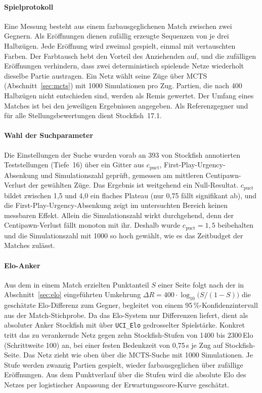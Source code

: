 \documentclass[
  a4paper, 12pt,
  parskip=half,
  headings=small,
  bibliography=totoc
]{scrartcl}
\begin{document}
\paragraph{Spielprotokoll}
Eine Messung besteht aus einem farbausgeglichenen Match zwischen zwei Gegnern.
Als Eröffnungen dienen zufällig erzeugte Sequenzen von je drei Halbzügen. Jede
Eröffnung wird zweimal gespielt, einmal mit vertauschten Farben. Der Farbtausch
hebt den Vorteil des Anziehenden auf, und die zufälligen Eröffnungen verhindern,
dass zwei deterministisch spielende Netze wiederholt dieselbe Partie austragen.
Ein Netz wählt seine Züge über MCTS
(Abschnitt~\ref{sec:mcts}) mit 1000 Simulationen pro Zug. Partien, die nach 400
Halbzügen nicht entschieden sind, werden als Remis gewertet. Der Umfang eines
Matches ist bei den jeweiligen Ergebnissen angegeben. Als Referenzgegner und für
alle Stellungsbewertungen dient Stockfish~17.1.

\paragraph{Wahl der Suchparameter}
Die Einstellungen der Suche wurden vorab an 393 von Stockfish annotierten
Teststellungen (Tiefe~16) über ein Gitter aus
\(c_{\mathrm{puct}}\), First-Play-Urgency-Absenkung und Simulationszahl geprüft,
gemessen am mittleren Centipawn-Verlust der gewählten Züge. Das Ergebnis ist
weitgehend ein Null-Resultat. \(c_{\mathrm{puct}}\) bildet zwischen 1{,}5 und 4{,}0
ein flaches Plateau (nur 0{,}75 fällt signifikant ab), und die
First-Play-Urgency-Absenkung zeigt im untersuchten Bereich keinen messbaren Effekt.
Allein die Simulationszahl wirkt durchgehend, denn der Centipawn-Verlust fällt
monoton mit ihr. Deshalb wurde \(c_{\mathrm{puct}} = 1{,}5\) beibehalten und die
Simulationszahl mit 1000 so hoch gewählt, wie es das Zeitbudget der Matches zulässt.

\paragraph{Elo-Anker}
Aus dem in einem Match erzielten Punktanteil \(S\) einer Seite folgt nach der in
Abschnitt~\ref{sec:elo} eingeführten Umkehrung
\(\Delta R = 400 \cdot \log_{10}\!\big(S/(1-S)\big)\) die geschätzte
Elo-Differenz zum Gegner, begleitet von einem 95\,\%-Konfidenzintervall aus der
Match-Stichprobe. Da das Elo-System nur Differenzen liefert, dient als absoluter
Anker Stockfish mit über \texttt{UCI\_Elo} gedrosselter Spielstärke. Konkret tritt
das zu verankernde Netz gegen zehn Stockfish-Stufen von 1400 bis 2300\,Elo
(Schrittweite 100) an, bei einer festen Bedenkzeit von 0{,}75\,s je Zug auf
Stockfish-Seite. Das Netz zieht wie oben über die MCTS-Suche mit 1000 Simulationen. Je
Stufe werden zwanzig Partien gespielt, wieder farbausgeglichen über zufällige
Eröffnungen. Aus dem Punktverlauf über die Stufen wird die absolute Elo des Netzes
per logistischer Anpassung der Erwartungsscore-Kurve geschätzt.
\end{document}

